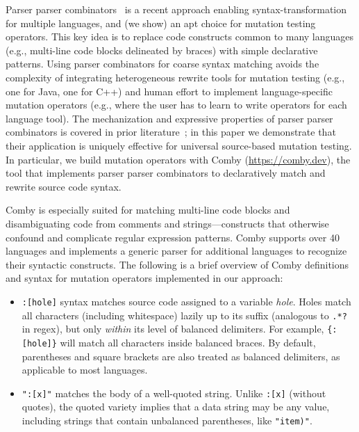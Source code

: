\documentclass[acmsmall,screen,review,anonymous]{acmart}
\begin{document}
{Parser parser combinators~\cite{vanTonderPPC} is a recent approach enabling
syntax-transformation for multiple languages, and (we show) an apt choice for
mutation testing operators. This key idea is to replace code constructs
common to many languages (e.g., multi-line code blocks delineated by braces)
with simple declarative patterns. Using parser combinators for coarse syntax
matching avoids the complexity of integrating heterogeneous rewrite tools for
mutation testing (e.g., one for Java, one for C++) and human effort to
implement language-specific mutation operators (e.g., where the user has to
learn to write operators for each language tool). The mechanization and
expressive properties of parser parser combinators is covered in prior
literature~\cite{vanTonderPPC}; in this paper we demonstrate that their application is
uniquely effective for universal source-based mutation testing. In
particular, we
build mutation operators with Comby (\url{https://comby.dev}), the tool that implements parser parser
combinators to declaratively match and rewrite source code syntax. 

Comby is especially suited for matching multi-line code blocks and
disambiguating code from comments and strings---constructs that otherwise
confound and complicate regular expression patterns. Comby supports over 40
languages and implements a generic parser for additional languages to recognize
their syntactic constructs. The following is a brief overview of Comby
definitions and syntax for mutation operators implemented in our approach:

\begin{itemize}

\item \texttt{\small:[hole]} syntax matches source code assigned to a variable \emph{hole}. Holes match all characters (including whitespace) lazily up to its suffix (analogous to \texttt{\small.*?} in regex), but only \emph{within} its level of balanced delimiters. For example, \texttt{\small\{:[hole]\}} will match all characters inside balanced braces. By default, parentheses and square brackets are also treated as balanced delimiters, as applicable to most languages. 

\item \texttt{\small ":[x]"} matches the body of a well-quoted string. Unlike \texttt{\small :[x]} (without quotes), the quoted variety implies that a data string may be any value, including strings that contain unbalanced parentheses, like \texttt{\small "item)"}.


\end{itemize}}
\end{document}
